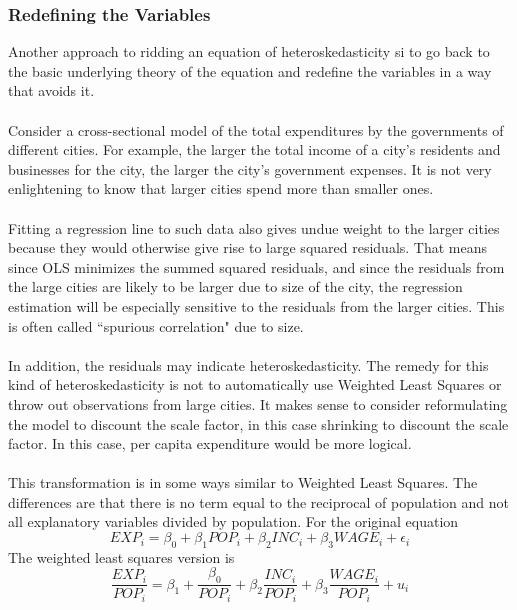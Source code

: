 \documentclass[11pt]{article}
\begin{document}
\subsubsection{Redefining the Variables}
Another approach to ridding an equation of heteroskedasticity  si to go back to the basic underlying theory of the equation and redefine the variables in a way that avoids it. \\ \\
Consider a cross-sectional model of the total expenditures by the governments of different cities. For example, the larger the total income of a city's residents and businesses for the city, the larger the city's government expenses. It is not very enlightening to know that larger cities spend more than smaller ones.\\ \\
Fitting a regression line to such data also gives undue weight to the larger cities because they would otherwise give rise to large squared residuals. That means since OLS minimizes the summed squared residuals, and since the residuals from the large cities are likely to be larger due to size of the city, the regression estimation will be especially sensitive to the residuals from the larger cities. This is often called ``spurious correlation" due to size.\\ \\
In addition, the residuals may indicate heteroskedasticity. The remedy for this kind of heteroskedasticity is not to automatically use Weighted Least Squares or throw out observations from large cities. It makes sense to consider reformulating the model to discount the scale factor, in this case shrinking to discount the scale factor. In this case, per capita expenditure would be more logical. \\ \\
This transformation is in some ways similar to Weighted Least Squares. The differences are that there is no term equal to the reciprocal of population and not all explanatory variables divided by population. For the original equation
\begin{equation}
EXP_i = \beta_0 + \beta_1POP_i + \beta_2INC_i + \beta_3WAGE_i+ \epsilon_i \label{eg10_17}
\end{equation}
The weighted least squares version is
\begin{equation}
\frac{EXP_i}{POP_i} =  \beta_1 + \frac{\beta_0}{POP_i} + \beta_2\frac{INC_i}{POP_i} + \beta_3\frac{WAGE_i}{POP_i} + u_i \label{eg10_18}
\end{equation}
\end{document}
